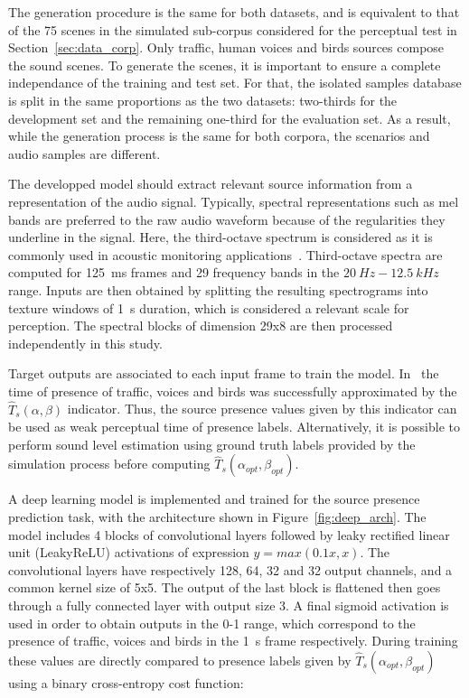 \documentclass[twocolumn]{article}
\begin{document}
The generation procedure is the same for both datasets, and is equivalent to that of the 75 scenes in the simulated sub-corpus considered for the perceptual test in Section~\ref{sec:data_corp}. Only traffic, human voices and birds sources compose the sound scenes. To generate the scenes, it is important to ensure a complete independance of the training and test set. For that, the isolated samples database is split in the same proportions as the two datasets: two-thirds for the development set and the remaining one-third for the evaluation set. As a result, while the generation process is the same for both corpora, the scenarios and audio samples are different.

The developped model should extract relevant source information from a representation of the audio signal. Typically, spectral representations such as mel bands are preferred to the raw audio waveform because of the regularities they underline in the signal. Here, the third-octave spectrum is considered as it is commonly used in acoustic monitoring applications~\cite{ardouin2018, gontier2017}. Third-octave spectra are computed for 125~ms frames and 29 frequency bands in the $20~Hz - 12.5~kHz$ range. Inputs are then obtained by splitting the resulting spectrograms into texture windows of 1~s duration, which is considered a relevant scale for perception. The spectral blocks of dimension 29x8 are then processed independently in this study.

Target outputs are associated to each input frame to train the model. In~\cite{gontier2018} the time of presence of traffic, voices and birds was successfully approximated by the $\hat T_s(\alpha, \beta)$ indicator. Thus, the source presence values given by this indicator can be used as weak perceptual time of presence labels. Alternatively, it is possible to perform sound level estimation using ground truth labels provided by the simulation process before computing $\hat T_s(\alpha_{opt}, \beta_{opt})$.

A deep learning model is implemented and trained for the source presence prediction task, with the architecture shown in Figure~\ref{fig:deep_arch}. The model includes 4 blocks of convolutional layers followed by leaky rectified linear unit (LeakyReLU) activations of expression $y = max(0.1x, x)$. The convolutional layers have respectively 128, 64, 32 and 32 output channels, and a common kernel size of 5x5. The output of the last block is flattened then goes through a fully connected layer with output size 3. A final sigmoid activation is used in order to obtain outputs in the 0-1 range, which correspond to the presence of traffic, voices and birds in the 1~s frame respectively. During training these values are directly compared to presence labels given by $\hat T_s(\alpha_{opt}, \beta_{opt})$ using a binary cross-entropy cost function:
\end{document}
